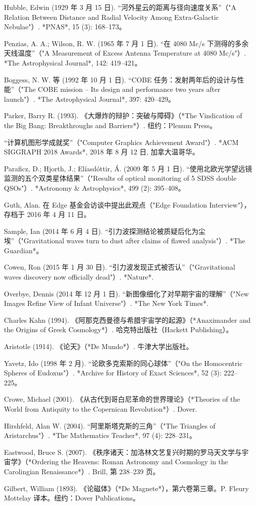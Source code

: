 \begin{enumerate}
Hubble, Edwin (1929 年 3 月 15 日). “河外星云的距离与径向速度关系”（"A Relation Between Distance and Radial Velocity Among Extra-Galactic Nebulae"）. *PNAS*, 15 (3): 168–173。  

Penzias, A. A.; Wilson, R. W. (1965 年 7 月 1 日). “在 4080 Mc/s 下测得的多余天线温度”（"A Measurement of Excess Antenna Temperature at 4080 Mc/s"）. *The Astrophysical Journal*, 142: 419–421。  

Boggess, N. W. 等 (1992 年 10 月 1 日). “COBE 任务：发射两年后的设计与性能”（"The COBE mission – Its design and performance two years after launch"）. *The Astrophysical Journal*, 397: 420–429。  

Parker, Barry R. (1993). 《大爆炸的辩护：突破与障碍》（*The Vindication of the Big Bang: Breakthroughs and Barriers*）. 纽约：Plenum Press。  

“计算机图形学成就奖”（"Computer Graphics Achievement Award"）. *ACM SIGGRAPH 2018 Awards*, 2018 年 8 月 12 日, 加拿大温哥华。  

Paraficz, D.; Hjorth, J.; Elíasdóttir, Á. (2009 年 5 月 1 日). “使用北欧光学望远镜监测的五个双类星体结果”（"Results of optical monitoring of 5 SDSS double QSOs"）. *Astronomy & Astrophysics*, 499 (2): 395–408。  

Guth, Alan. 在 Edge 基金会访谈中提出此观点（"Edge Foundation Interview"），存档于 2016 年 4 月 11 日。  

Sample, Ian (2014 年 6 月 4 日). “引力波探测结论被质疑后化为尘埃”（"Gravitational waves turn to dust after claims of flawed analysis"）. *The Guardian*。  

Cowen, Ron (2015 年 1 月 30 日). “引力波发现正式被否认”（"Gravitational waves discovery now officially dead"）. *Nature*.  

Overbye, Dennis (2014 年 12 月 1 日). “新图像细化了对早期宇宙的理解”（"New Images Refine View of Infant Universe"）. *The New York Times*.  

Charles Kahn (1994). 《阿那克西曼德与希腊宇宙学的起源》（*Anaximander and the Origins of Greek Cosmology*）. 哈克特出版社（Hackett Publishing）。  

Aristotle (1914). 《论天》（*De Mundo*）. 牛津大学出版社。  

Yavetz, Ido (1998 年 2 月). “论欧多克索斯的同心球体”（"On the Homocentric Spheres of Eudoxus"）. *Archive for History of Exact Sciences*, 52 (3): 222–225。  

Crowe, Michael (2001). 《从古代到哥白尼革命的世界理论》（*Theories of the World from Antiquity to the Copernican Revolution*）. Dover.  

Hirshfeld, Alan W. (2004). “阿里斯塔克斯的三角”（"The Triangles of Aristarchus"）. *The Mathematics Teacher*, 97 (4): 228–231。  

Eastwood, Bruce S. (2007). 《秩序诸天：加洛林文艺复兴时期的罗马天文学与宇宙学》（*Ordering the Heavens: Roman Astronomy and Cosmology in the Carolingian Renaissance*）. Brill, 第 238–239 页。  

Gilbert, William (1893). 《论磁体》（*De Magnete*），第六卷第三章。P. Fleury Mottelay 译本。纽约：Dover Publications。
\end{enumerate}


